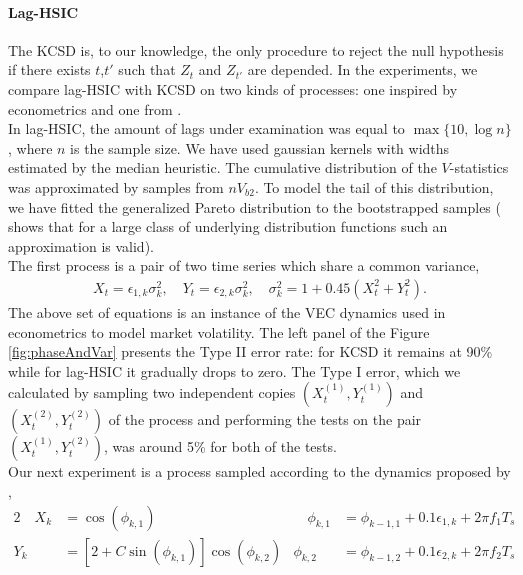 \paragraph{Lag-HSIC}
The KCSD  \cite{besserve_statistical_2013} is, to our knowledge, the only procedure to reject the null hypothesis if there exists $t$,$t'$ such that $Z_t$ and $Z_{t'}$ are depended. In the experiments, we compare lag-HSIC with KCSD on two kinds of processes: one  inspired by econometrics and one from \cite{besserve_statistical_2013}.\\ 
In lag-HSIC, the amount of lags under examination was equal to $\max\{10,\log n\}$, where $n$ is the sample size. We have used gaussian kernels with widths estimated by the median heuristic. The cumulative distribution of the $V$-statistics was approximated by samples from $n V_{b2}$. To model the tail of this distribution, we have fitted the generalized Pareto distribution to the bootstrapped samples (\cite{pickands1975statistical} shows that for a large class of underlying distribution functions such an approximation is valid).\\
The first process is a pair of two time series which share a common variance,   
\begin{align}
\label{eq:dynamics2}
 X_t = \epsilon_{1,k} \sigma_k^2, \quad  Y_t = \epsilon_{2,k}  \sigma_k^2,  \quad \sigma_k^2 = 1 + 0.45(X_t^2 + Y_t^2 ).
\end{align}
The above set of equations is an instance of the VEC dynamics \cite{bauwens_multivariate_2006} used in econometrics to model market volatility. The left panel of the Figure \ref{fig:phaseAndVar} presents the Type II error rate: for KCSD it remains at 90\% while for lag-HSIC it gradually drops to zero. The Type I error, which we calculated by sampling two independent copies $(X^{(1)}_{t},Y^{(1)}_{t})$ and $(X^{(2)}_{t},Y^{(2)}_{t})$ of the process and performing the tests on the pair $(X^{(1)}_{t},Y^{(2)}_{t})$, was around 5\% for both of the tests.\\
Our next experiment is a process sampled according to the dynamics proposed by \cite{besserve_statistical_2013},      
\begin{alignat}{2}
  \quad X_k &= \cos(\phi_{k,1})   &\quad  \phi_{k,1} &= \phi_{k-1,1} + 0.1\epsilon_{1,k} + 2 \pi f_1 T_s \label{eg:dymamics1a} \\  
  Y_k &= [2+C\sin(\phi_{k,1})]\cos(\phi_{k,2})  &   \phi_{k,2} &= \phi_{k-1,2} + 0.1\epsilon_{2,k} + 2 \pi f_2 T_s \label{eg:dymamics1b}
\end{alignat}
